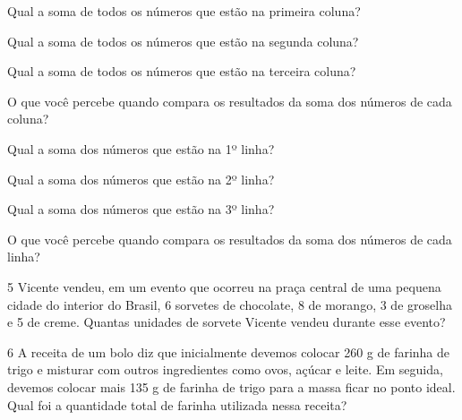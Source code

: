 \begin{escolha}
\item Qual a soma de todos os números que estão na primeira coluna?


\item Qual a soma de todos os números que estão na segunda coluna?


\item Qual a soma de todos os números que estão na terceira coluna?


\item O que você percebe quando compara os resultados da soma dos números de cada coluna?


\item Qual a soma dos números que estão na 1º linha?


\item Qual a soma dos números que estão na 2º linha?


\item Qual a soma dos números que estão na 3º linha?


\item O que você percebe quando compara os resultados da soma dos números de cada linha?

\end{escolha}

\num{5} Vicente vendeu, em um evento que ocorreu na praça central de uma pequena
cidade do interior do Brasil, 6 sorvetes de chocolate, 8 de morango, 3
de groselha e 5 de creme. Quantas unidades de sorvete Vicente vendeu durante esse evento?


\num{6} A receita de um bolo diz que inicialmente devemos colocar 260 g de
farinha de trigo e misturar com outros ingredientes como ovos, açúcar e
leite. Em seguida, devemos colocar mais 135 g de farinha de trigo para a
massa ficar no ponto ideal. Qual foi a quantidade total de farinha
utilizada nessa receita?

